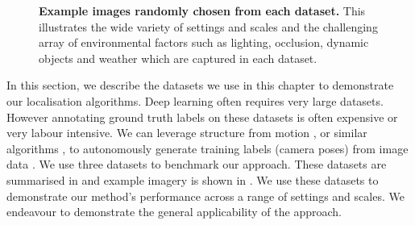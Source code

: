 \begin{figure}[p]
\caption[Localisation datasets.]{\textbf{Example images randomly chosen from each dataset.} This illustrates the wide variety of settings and scales and the challenging array of environmental factors such as lighting, occlusion, dynamic objects and weather which are captured in each dataset.}
\label{fig:datasets}
\end{figure}



In this section, we describe the datasets we use in this chapter to demonstrate our localisation algorithms.
Deep learning often requires very large datasets. However annotating ground truth labels on these datasets is often expensive or very labour intensive. We can leverage structure from motion \citep{Snavely08IJCV}, or similar algorithms \citep{shotton2013scene}, to autonomously generate training labels (camera poses) from image data \citep{kendall2015posenet}. We use three datasets to benchmark our approach. These datasets are summarised in  and example imagery is shown in . We use these datasets to demonstrate our method's performance across a range of settings and scales. We endeavour to demonstrate the general applicability of the approach.

